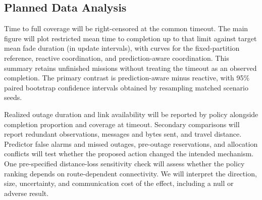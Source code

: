 \subsection{Planned Data Analysis}

Time to full coverage will be right-censored at the common timeout. The main figure will plot restricted mean time to completion up to that limit against target mean fade duration (in update intervals), with curves for the fixed-partition reference, reactive coordination, and prediction-aware coordination. This summary retains unfinished missions without treating the timeout as an observed completion. The primary contrast is prediction-aware minus reactive, with 95\% paired bootstrap confidence intervals obtained by resampling matched scenario seeds.

Realized outage duration and link availability will be reported by policy alongside completion proportion and coverage at timeout. Secondary comparisons will report redundant observations, messages and bytes sent, and travel distance. Predictor false alarms and missed outages, pre-outage reservations, and allocation conflicts will test whether the proposed action changed the intended mechanism. One pre-specified distance-loss sensitivity check will assess whether the policy ranking depends on route-dependent connectivity. We will interpret the direction, size, uncertainty, and communication cost of the effect, including a null or adverse result.
